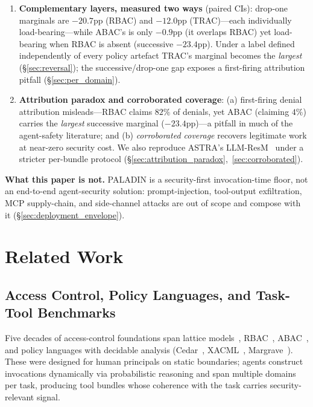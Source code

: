 \documentclass[sigconf,review,anonymous]{acmart}
\begin{document}
\begin{enumerate}
  \item \textbf{Complementary layers, measured two ways} (paired CIs): drop-one marginals are $-20.7$pp (RBAC) and $-12.0$pp (TRAC)---each individually load-bearing---while ABAC's is only $-0.9$pp (it overlaps RBAC) yet load-bearing when RBAC is absent (successive $-23.4$pp). Under a label defined independently of every policy artefact TRAC's marginal becomes the \emph{largest} (\S\ref{sec:reversal}); the successive/drop-one gap exposes a first-firing attribution pitfall (\S\ref{sec:per_domain}).

  \item \textbf{Attribution paradox and corroborated coverage}: (a) first-firing denial attribution misleads---RBAC claims $82\%$ of denials, yet ABAC (claiming $4\%$) carries the \emph{largest} successive marginal ($-23.4$pp)---a pitfall in much of the agent-safety literature; and (b) \emph{corroborated coverage} recovers legitimate work at near-zero security cost. We also reproduce ASTRA's LLM-ResM~\cite{elhelou2025astra} under a stricter per-bundle protocol (\S\ref{sec:attribution_paradox},~\ref{sec:corroborated}).
\end{enumerate}

\noindent\textbf{What this paper is not.} PALADIN is a security-first invocation-time floor, not an end-to-end agent-security solution: prompt-injection, tool-output exfiltration, MCP supply-chain, and side-channel attacks are out of scope and compose with it (\S\ref{sec:deployment_envelope}).

\section{Related Work}
\label{sec:related}

\subsection{Access Control, Policy Languages, and Task-Tool Benchmarks}
\label{sec:access_control}

Five decades of access-control foundations span lattice models~\cite{bell1973secure}, RBAC~\cite{sandhu1996role,ferraiolo2001proposed}, ABAC~\cite{hu2014guide}, and policy languages with decidable analysis (Cedar~\cite{cutler2024cedar}, XACML~\cite{oasis2013xacml}, Margrave~\cite{fisler2005verification}). These were designed for human principals on static boundaries; agents construct invocations dynamically via probabilistic reasoning and span multiple domains per task, producing tool bundles whose coherence with the task carries security-relevant signal.
\end{document}
